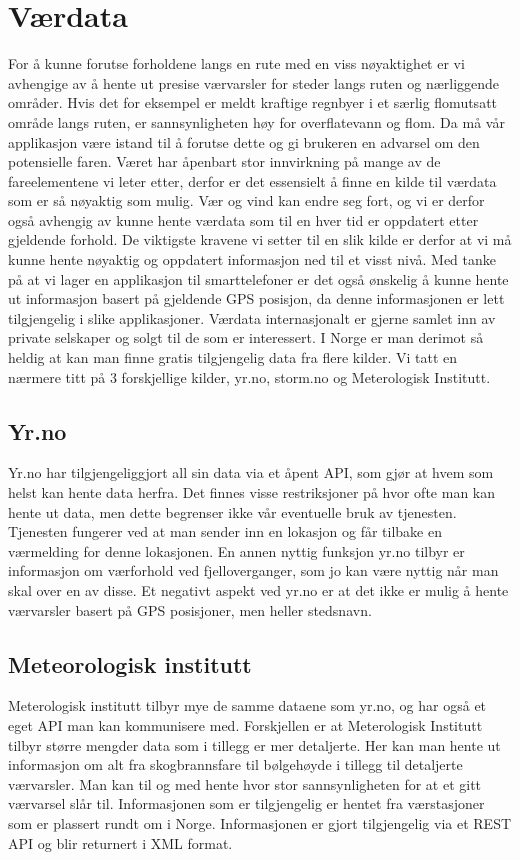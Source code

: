\documentclass[a4paper,norsk,oneside]{book}
\begin{document}
\section{Værdata}
For å kunne forutse forholdene langs en rute med en viss nøyaktighet er vi avhengige av å hente ut presise værvarsler for steder langs ruten og nærliggende områder. Hvis det for eksempel er meldt kraftige regnbyer i et særlig flomutsatt område langs ruten, er sannsynligheten høy for overflatevann og flom. Da må vår applikasjon være istand til å forutse dette og gi brukeren en advarsel om den potensielle faren. Været har åpenbart stor innvirkning på mange av de fareelementene vi leter etter, derfor er det essensielt å finne en kilde til værdata som er så nøyaktig som mulig. Vær og vind kan endre seg fort, og vi er derfor også avhengig av kunne hente værdata som til en hver tid er oppdatert etter gjeldende forhold. De viktigste kravene vi setter til en slik kilde er derfor at vi må kunne hente nøyaktig og oppdatert informasjon ned til et visst nivå. Med tanke på at vi lager en applikasjon til smarttelefoner er det også ønskelig å kunne hente ut informasjon basert på gjeldende GPS posisjon, da denne informasjonen er lett tilgjengelig i slike applikasjoner. Værdata internasjonalt er gjerne samlet inn av private selskaper og solgt til de som er interessert. I Norge er man derimot så heldig at kan man finne gratis tilgjengelig data fra flere kilder. Vi tatt en nærmere titt på 3 forskjellige kilder, yr.no, storm.no og Meterologisk Institutt.

\subsection{Yr.no}
Yr.no har tilgjengeliggjort all sin data via et åpent API,\cite{yr} som gjør at hvem som helst kan hente data herfra. Det finnes visse restriksjoner på hvor ofte man kan hente ut data, men dette begrenser ikke vår eventuelle bruk av tjenesten. Tjenesten fungerer ved at man sender inn en lokasjon og får tilbake en værmelding for denne lokasjonen. En annen nyttig funksjon yr.no tilbyr er informasjon om værforhold ved fjelloverganger, som jo kan være nyttig når man skal over en av disse. Et negativt aspekt ved yr.no er at det ikke er mulig å hente værvarsler basert på GPS posisjoner, men heller stedsnavn.

\subsection{Meteorologisk institutt}
Meterologisk institutt tilbyr mye de samme dataene som yr.no, og har også et eget API man kan kommunisere med.\cite{met} Forskjellen er at Meterologisk Institutt tilbyr større mengder data som i tillegg er mer detaljerte. Her kan man hente ut informasjon om alt fra skogbrannsfare til bølgehøyde i tillegg til detaljerte værvarsler. Man kan til og med hente hvor stor sannsynligheten for at et gitt værvarsel slår til. Informasjonen som er tilgjengelig er hentet fra værstasjoner som er plassert rundt om i Norge. Informasjonen er gjort tilgjengelig via et REST API og blir returnert i XML format.
\end{document}
